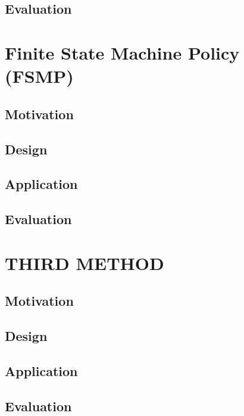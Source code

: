 \documentclass[solution, letterpaper]{cs121}
\begin{document}
\subsection{Evaluation}

\section{Finite State Machine Policy (FSMP)}
\subsection{Motivation}
\subsection{Design}
\subsection{Application}
\subsection{Evaluation}

\section{THIRD METHOD}
\subsection{Motivation}
\subsection{Design}
\subsection{Application}
\subsection{Evaluation}
\end{document}
